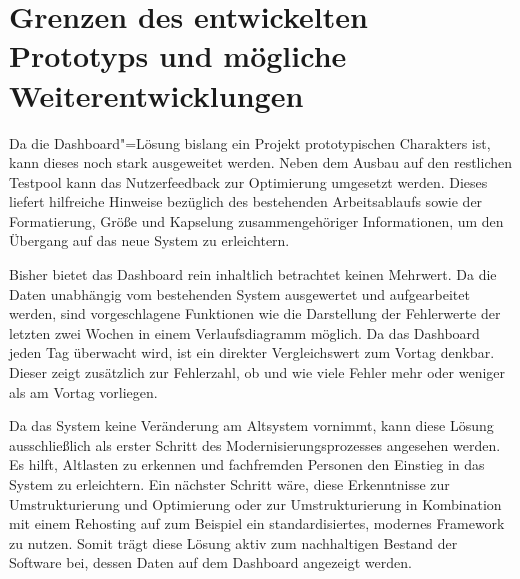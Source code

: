\section{Grenzen des entwickelten Prototyps und mögliche Weiterentwicklungen}

Da die Dash\-board"=Lösung bislang ein Projekt prototypischen Charakters ist, kann dieses noch stark ausgeweitet werden. Neben dem Ausbau auf den restlichen Testpool kann das Nutzerfeedback zur Optimierung umgesetzt werden. Dieses liefert hilfreiche Hinweise bezüglich des bestehenden Arbeitsablaufs sowie der Formatierung, Größe und Kapselung zusammengehöriger Informationen, um den Übergang auf das neue System zu erleichtern.

Bisher bietet das Dash\-board rein inhaltlich betrachtet keinen Mehrwert. Da die Daten unabhängig vom bestehenden System ausgewertet und aufgearbeitet werden, sind vorgeschlagene Funktionen wie die Darstellung der Fehlerwerte der letzten zwei Wochen in einem Verlaufsdiagramm möglich. Da das Dash\-board jeden Tag überwacht wird, ist ein direkter Vergleichswert zum Vortag denkbar. Dieser zeigt zusätzlich zur Fehlerzahl, ob und wie viele Fehler mehr oder weniger als am Vortag vorliegen.

Da das System keine Veränderung am Altsystem vornimmt, kann diese Lösung ausschließlich als erster Schritt des Modernisierungsprozesses angesehen werden. Es hilft, Altlasten zu erkennen und fachfremden Personen den Einstieg in das System zu erleichtern. Ein nächster Schritt wäre, diese Erkenntnisse zur Umstrukturierung und Optimierung oder zur Umstrukturierung in Kombination mit einem Rehosting auf zum Beispiel ein standardisiertes, modernes Framework zu nutzen. Somit trägt diese Lösung aktiv zum nachhaltigen Bestand der Software bei, dessen Daten auf dem Dash\-board angezeigt werden.
